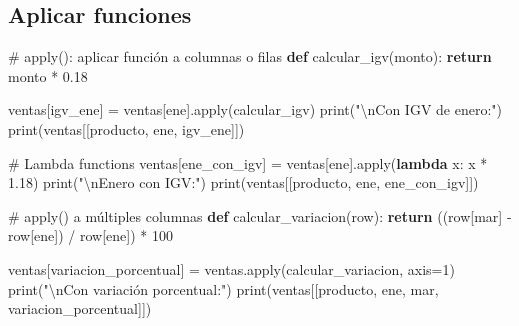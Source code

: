 \documentclass[
  doc,
  floatsintext,
  longtable,
  a4paper,
  nolmodern,
  notxfonts,
  notimes,
  12pt,
  colorlinks=true,linkcolor=blue,citecolor=blue,urlcolor=blue]{apa7}
\newenvironment{Shaded}{\begin{snugshade}}{\end{snugshade}}
\newcommand{\BuiltInTok}[1]{\textcolor[rgb]{0.00,0.23,0.31}{#1}}
\newcommand{\CharTok}[1]{\textcolor[rgb]{0.13,0.47,0.30}{#1}}
\newcommand{\CommentTok}[1]{\textcolor[rgb]{0.37,0.37,0.37}{#1}}
\newcommand{\ControlFlowTok}[1]{\textcolor[rgb]{0.00,0.23,0.31}{\textbf{#1}}}
\newcommand{\DecValTok}[1]{\textcolor[rgb]{0.68,0.00,0.00}{#1}}
\newcommand{\FloatTok}[1]{\textcolor[rgb]{0.68,0.00,0.00}{#1}}
\newcommand{\KeywordTok}[1]{\textcolor[rgb]{0.00,0.23,0.31}{\textbf{#1}}}
\newcommand{\NormalTok}[1]{\textcolor[rgb]{0.00,0.23,0.31}{#1}}
\newcommand{\OperatorTok}[1]{\textcolor[rgb]{0.37,0.37,0.37}{#1}}
\newcommand{\StringTok}[1]{\textcolor[rgb]{0.13,0.47,0.30}{#1}}
\begin{document}
\subsection{Aplicar funciones}\label{aplicar-funciones}

\begin{Shaded}
\begin{Highlighting}[]
\CommentTok{\# apply(): aplicar función a columnas o filas}
\KeywordTok{def}\NormalTok{ calcular\_igv(monto):}
    \ControlFlowTok{return}\NormalTok{ monto }\OperatorTok{*} \FloatTok{0.18}

\NormalTok{ventas[}\StringTok{\textquotesingle{}igv\_ene\textquotesingle{}}\NormalTok{] }\OperatorTok{=}\NormalTok{ ventas[}\StringTok{\textquotesingle{}ene\textquotesingle{}}\NormalTok{].}\BuiltInTok{apply}\NormalTok{(calcular\_igv)}
\BuiltInTok{print}\NormalTok{(}\StringTok{"}\CharTok{\textbackslash{}n}\StringTok{Con IGV de enero:"}\NormalTok{)}
\BuiltInTok{print}\NormalTok{(ventas[[}\StringTok{\textquotesingle{}producto\textquotesingle{}}\NormalTok{, }\StringTok{\textquotesingle{}ene\textquotesingle{}}\NormalTok{, }\StringTok{\textquotesingle{}igv\_ene\textquotesingle{}}\NormalTok{]])}

\CommentTok{\# Lambda functions}
\NormalTok{ventas[}\StringTok{\textquotesingle{}ene\_con\_igv\textquotesingle{}}\NormalTok{] }\OperatorTok{=}\NormalTok{ ventas[}\StringTok{\textquotesingle{}ene\textquotesingle{}}\NormalTok{].}\BuiltInTok{apply}\NormalTok{(}\KeywordTok{lambda}\NormalTok{ x: x }\OperatorTok{*} \FloatTok{1.18}\NormalTok{)}
\BuiltInTok{print}\NormalTok{(}\StringTok{"}\CharTok{\textbackslash{}n}\StringTok{Enero con IGV:"}\NormalTok{)}
\BuiltInTok{print}\NormalTok{(ventas[[}\StringTok{\textquotesingle{}producto\textquotesingle{}}\NormalTok{, }\StringTok{\textquotesingle{}ene\textquotesingle{}}\NormalTok{, }\StringTok{\textquotesingle{}ene\_con\_igv\textquotesingle{}}\NormalTok{]])}

\CommentTok{\# apply() a múltiples columnas}
\KeywordTok{def}\NormalTok{ calcular\_variacion(row):}
    \ControlFlowTok{return}\NormalTok{ ((row[}\StringTok{\textquotesingle{}mar\textquotesingle{}}\NormalTok{] }\OperatorTok{{-}}\NormalTok{ row[}\StringTok{\textquotesingle{}ene\textquotesingle{}}\NormalTok{]) }\OperatorTok{/}\NormalTok{ row[}\StringTok{\textquotesingle{}ene\textquotesingle{}}\NormalTok{]) }\OperatorTok{*} \DecValTok{100}

\NormalTok{ventas[}\StringTok{\textquotesingle{}variacion\_porcentual\textquotesingle{}}\NormalTok{] }\OperatorTok{=}\NormalTok{ ventas.}\BuiltInTok{apply}\NormalTok{(calcular\_variacion, axis}\OperatorTok{=}\DecValTok{1}\NormalTok{)}
\BuiltInTok{print}\NormalTok{(}\StringTok{"}\CharTok{\textbackslash{}n}\StringTok{Con variación porcentual:"}\NormalTok{)}
\BuiltInTok{print}\NormalTok{(ventas[[}\StringTok{\textquotesingle{}producto\textquotesingle{}}\NormalTok{, }\StringTok{\textquotesingle{}ene\textquotesingle{}}\NormalTok{, }\StringTok{\textquotesingle{}mar\textquotesingle{}}\NormalTok{, }\StringTok{\textquotesingle{}variacion\_porcentual\textquotesingle{}}\NormalTok{]])}


\end{Highlighting}
\end{Shaded}
\end{document}
